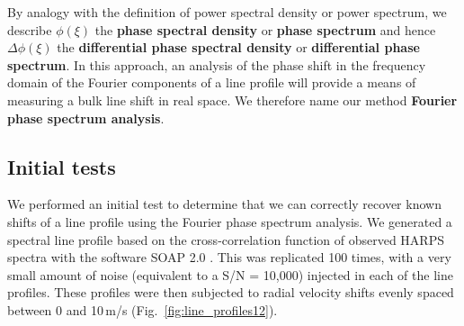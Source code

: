 By analogy with the definition of power spectral density or power spectrum, we describe $\phi(\xi)$ the \textbf{phase spectral density} or \textbf{phase spectrum} and hence $\Delta \phi(\xi)$ the \textbf{differential phase spectral density} or \textbf{differential phase spectrum}. In this approach, an analysis of the phase shift in the frequency domain of the Fourier components of a line profile will provide a means of measuring a bulk line shift in real space. We therefore name our method \textbf{Fourier phase spectrum analysis}. 



\subsection{Initial tests}
\label{sec:Initial_tests}

We performed an initial test to determine that we can correctly recover known shifts of a line profile using the Fourier phase spectrum analysis. We generated a spectral line profile based on the cross-correlation function of observed HARPS spectra with the software SOAP 2.0 \cite{Dumusque2014SOAP}. This was replicated 100 times, with a very small amount of 
noise (equivalent to a S/N = 10,000) injected in each of the line profiles. These profiles were then
subjected to radial velocity shifts evenly spaced between 0 and 10\,m/s (Fig.~\ref{fig:line_profiles12}). 

